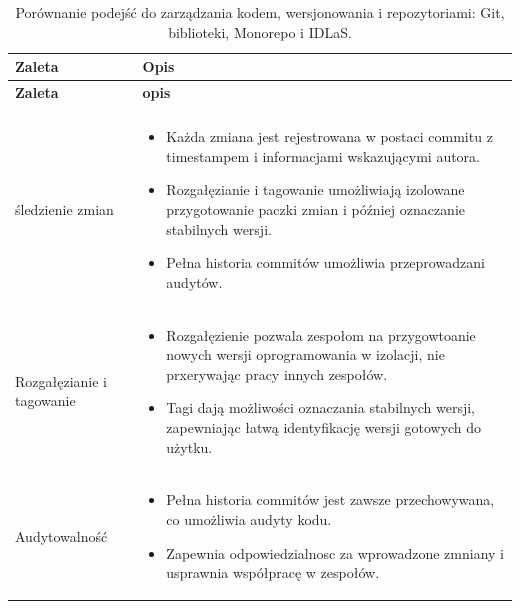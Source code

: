 \documentclass[runningheads,12pt]{llncs}
\begin{document}
\begin{longtable}{|C{3cm}|C{9.1cm}|}
    \caption{Porównanie podejść do zarządzania kodem, wersjonowania i repozytoriami: Git, biblioteki, Monorepo i IDLaS.} \\
    \hline
    \textbf{Zaleta} & \textbf{Opis} \\
    \hline
    \endfirsthead

    \hline
    \textbf{Zaleta} & \textbf{opis} \\
    \hline
    \endhead

    \hline
    \endfoot

    \hline
    \endlastfoot

     \\ \hline
    śledzienie zmian &
    \begin{itemize}
      \item Każda zmiana jest rejestrowana w postaci commitu z timestampem i informacjami wskazującymi autora.
      \item Rozgałęzianie i tagowanie umożliwiają izolowane przygotowanie paczki zmian i później oznaczanie stabilnych wersji.
      \item Pełna historia commitów umożliwia przeprowadzani audytów.
    \end{itemize} \\ \hline
    Rozgałęzianie i tagowanie &
    \begin{itemize}
      \item Rozgałęzienie pozwala zespołom na przygowtoanie nowych wersji oprogramowania w izolacji, nie prxerywając pracy innych zespołów.
      \item Tagi dają możliwości oznaczania stabilnych wersji, zapewniając łatwą identyfikację wersji gotowych do użytku.
    \end{itemize} \\ \hline
    Audytowalność &
    \begin{itemize}
      \item Pełna historia commitów jest zawsze przechowywana, co umożliwia audyty kodu.
      \item Zapewnia odpowiedzialnosc za wprowadzone zmniany i usprawnia współpracę w zespołów.
    \end{itemize} \\ \hline
    

\end{longtable}
\end{document}
